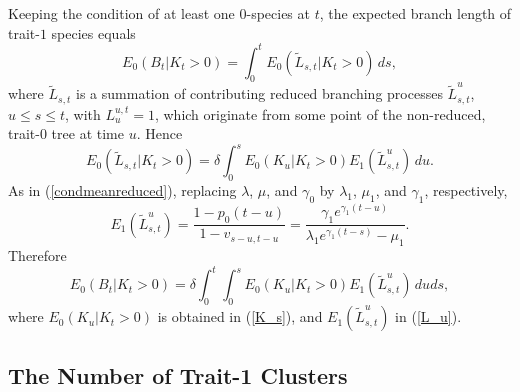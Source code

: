 \documentclass[a4paper,11pt]{article}
\theoremstyle{plain}
\theoremstyle{definition}
\numberwithin{equation}{section}
\begin{document}
Keeping the condition of at least one $0$-species at $t$, the expected
branch length of trait-$1$ species equals
\[
E_0(B_t|K_t>0) =\int_0^tE_0(\widetilde L_{s,t}|K_t>0)\,ds,
\]
where $\widetilde L_{s,t}$ is a summation of contributing reduced branching
processes $\widetilde L_{s,t}^u$, $u\le s\le t$, with $L^{u,t}_u=1$,
which originate from some point of the non-reduced, trait-$0$ tree
at time $u$.  Hence
\[
E_0(\widetilde L_{s,t}|K_t>0)=\delta \int_0^s E_0(K_u|K_t>0)
E_1(\widetilde L^u_{s,t})\,du.
\]
As in (\ref{condmeanreduced}), replacing $\lambda$, $\mu$, and $\gamma_0$
by $\lambda_1$, $\mu_1$,  and $\gamma_1$, respectively,
\begin{equation}
 \label{L_u}
E_1(\widetilde L^u_{s,t})
=\frac{1-p_0(t-u)}{1-v_{s-u,t-u}}
=\frac{\gamma_1e^{\gamma_1(t-u)}}{\lambda_1e^{\gamma_1(t-s)}-\mu_1}.
\end{equation}
Therefore
\begin{equation}
E_0(B_t|K_t>0)=\delta \int_0^t\int_0^s E_0(K_u|K_t>0)  E_1(\widetilde L^u_{s,t})\,duds,
 \label{branchlengthselfers}
\end{equation}
where
$E_0(K_u|K_t>0)$ is obtained in (\ref{K_s}), and $E_1(\widetilde L^u_{s,t})$ in (\ref{L_u}).


\subsection*{The Number of Trait-1 Clusters}\label{sec:cluster}
\end{document}
